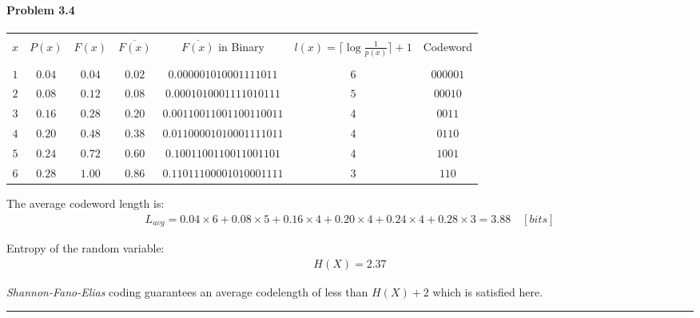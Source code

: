 \documentclass[12pt, letterpaper]{scrartcl}
\begin{document}
\paragraph*{Problem 3.4} \hfill\newline
\begin{center}
    \begin{tabular}{ c c c c c c c } 
     \hline
     \\$x$ & $P(x)$ & $F(x)$ & $\overline{F(x)}$ &$\overline{F(x)}$ in Binary & $l(x)=\lceil\log{\frac{1}{p(x)}}\rceil+1$ & Codeword\\\\
     \hline
     $1$ & $0.04$ & $0.04$ & $0.02$ & $0.000001010001111011$ & $6$ & $000001$ \\
     $2$ & $0.08$ & $0.12$ & $0.08$ & $0.0001010001111010111$ & $5$ & $00010$ \\
     $3$ & $0.16$ & $0.28$ & $0.20$ & $0.00110011001100110011$ & $4$ & $0011$ \\
     $4$ & $0.20$ & $0.48$ & $0.38$ & $0.01100001010001111011$ & $4$ & $0110$ \\
     $5$ & $0.24$ & $0.72$ & $0.60$ & $0.1001100110011001101$ & $4$ & $1001$ \\
     $6$ & $0.28$ & $1.00$ & $0.86$ & $0.11011100001010001111$ & $3$ & $110$ \\
     \hline
    \end{tabular}
\end{center}


The average codeword length is:
\begin{align*}
    L_{avg} = 0.04\times6+0.08\times5+0.16\times4+0.20\times4+0.24\times4+0.28\times3=3.88 \quad[bits]
\end{align*}

Entropy of the random variable:
\begin{align*}
    H(X) = 2.37
\end{align*}

\emph{Shannon-Fano-Elias} coding guarantees an average codelength of less than $H(X)+2$ which is satisfied here.\\
\hrule
\end{document}

